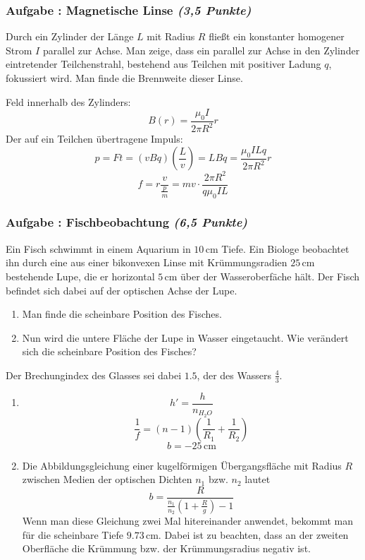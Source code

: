 \documentclass[12pt,a4paper]{article}
\newcommand{\unit}[1]{\,\mathrm{#1}}
\newenvironment{abcenum}{\renewcommand{\labelenumi}{(\alph{enumi})} \begin{enumerate}}{\end{enumerate}\renewcommand{\labelenumi}{\theenumi .}}
\newcounter{numlabel}
\newenvironment{problem}[2]{\stepcounter{numlabel} \vspace{1ex} \subsubsection*{Aufgabe \the\value{numlabel}: #1 \emph{(#2 Punkte)}} \renewcommand{\Currentlabel}{Aufgabe \the\value{numlabel}: #1}}{

}
\begin{document}
\begin{problem}{Magnetische Linse}{3,5}
Durch ein Zylinder der Länge $L$ mit Radius $R$ fließt ein konstanter homogener Strom $I$ parallel zur Achse. Man zeige, dass ein parallel zur Achse in den Zylinder eintretender Teilchenstrahl, bestehend aus Teilchen mit positiver Ladung $q$, fokussiert wird. Man finde die Brennweite dieser Linse.
\begin{solution}
Feld innerhalb des Zylinders:
\[
B(r)=\frac{\mu_0 I}{2 \pi R^2}r
\]
Der auf ein Teilchen übertragene Impuls:
\[
p=Ft=(vBq)(\frac Lv)=LBq=\frac{\mu_0 I L q}{2 \pi R^2}r
\]
\[
f=r\frac{v}{\frac pm}=mv \cdot \frac{2 \pi R^2}{q \mu_0 I L}
\]
\end{solution}
\end{problem}

\begin{problem}{Fischbeobachtung}{6,5}
Ein Fisch schwimmt in einem Aquarium in $10 \unit{cm}$ Tiefe. Ein Biologe beobachtet ihn durch eine aus einer bikonvexen Linse mit Krümmungsradien $25 \unit{cm}$ bestehende Lupe, die er horizontal $5 \unit{cm}$ über der Wasseroberfäche hält. Der Fisch befindet sich dabei auf der optischen Achse der Lupe.
\begin{abcenum}
\item Man finde die scheinbare Position des Fisches.
\item Nun wird die untere Fläche der Lupe in Wasser eingetaucht. Wie verändert sich die scheinbare Position des Fisches?
\end{abcenum}
Der Brechungindex des Glasses sei dabei $1.5$, der des Wassers $\frac43$.
\begin{solution}
\begin{abcenum}
\item
\[
h'=\frac{h}{n_{H_2O}}
\]
\[
\frac 1f = (n-1)\left( \frac 1{R_1}+\frac 1{R_2} \right)
\]
\[
b=-25 \unit{cm}
\]
\item
Die Abbildungsgleichung einer kugelförmigen Übergangsfläche mit Radius $R$ zwischen Medien der optischen Dichten $n_1$ bzw. $n_2$ lautet
\[
b = \frac{R}{\frac{n_1}{n_2} \left( 1+\frac R g \right) -1}
\]
Wenn man diese Gleichung zwei Mal hitereinander anwendet, bekommt man für die scheinbare Tiefe $9.73 \unit{cm}$. Dabei ist zu beachten, dass an der zweiten Oberfläche die Krümmung bzw. der Krümmungsradius negativ ist.
\end{abcenum}
\end{solution}
\end{problem}
\end{document}
